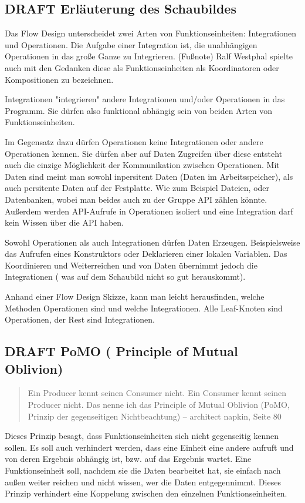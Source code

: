 \documentclass[a4paper,12pt,oneside]{book}
\begin{document}
\subsection{DRAFT Erläuterung des Schaubildes}
\label{sec-4-1-1}
Das Flow Design unterscheidet zwei Arten von Funktionseinheiten: Integrationen und Operationen.
Die Aufgabe einer Integration ist, die unabhängigen Operationen in das große Ganze zu
Integrieren.
(Fußnote) Ralf Westphal spielte auch mit den Gedanken diese als Funktionseinheiten als Koordinatoren oder
Kompositionen zu bezeichnen.

Integrationen "integrieren" andere Integrationen und/oder Operationen in das Programm. Sie dürfen also funktional abhängig sein
von beiden Arten von Funktionseinheiten.

Im Gegensatz dazu dürfen Operationen keine Integrationen oder andere Operationen kennen.
Sie dürfen aber auf Daten Zugreifen über diese entsteht auch die einzige Möglichkeit der Kommunikation zwischen Operationen.
Mit Daten sind meint man sowohl inpersitent Daten (Daten im Arbeitsspeicher), als auch persitente Daten auf der Festplatte.
Wie zum Beispiel Dateien, oder Datenbanken, wobei man beides auch zu der Gruppe API zählen könnte.
Außerdem werden API-Aufrufe in Operationen isoliert und eine Integration darf kein Wissen über die API haben.

Sowohl Operationen als auch Integrationen dürfen Daten Erzeugen.
Beispielsweise das Aufrufen eines Konstruktors oder Deklarieren einer lokalen Variablen.
Das Koordinieren und Weiterreichen und von Daten übernimmt jedoch die Integrationen ( was auf dem Schaubild nicht so
gut herauskommt).

Anhand einer Flow Design Skizze, kann man leicht herausfinden, welche Methoden Operationen sind und welche
Integrationen.
Alle Leaf-Knoten sind Operationen, der Rest sind Integrationen.



\subsection{DRAFT PoMO ( Principle of Mutual Oblivion)}
\label{sec-4-1-2}
\begin{quote}
Ein Producer kennt seinen Consumer nicht. Ein Consumer kennt seinen Producer
nicht. Das nenne ich das Principle of Mutual Oblivion (PoMO,
Prinzip der gegenseitigen Nichtbeachtung) -- architect napkin, Seite 80
\end{quote}

Dieses Prinzip besagt, dass Funktionseinheiten sich nicht gegenseitig kennen sollen.
Es soll auch verhindert werden, dass eine Einheit eine andere aufruft und von deren Ergebnis
abhängig ist, bzw. auf das Ergebnis wartet.
Eine Funktionseinheit soll, nachdem sie die Daten bearbeitet hat, sie einfach nach
außen weiter reichen und nicht wissen, wer die Daten entgegennimmt.
Dieses Prinzip verhindert eine Koppelung zwischen den einzelnen Funktionseinheiten.
\end{document}
